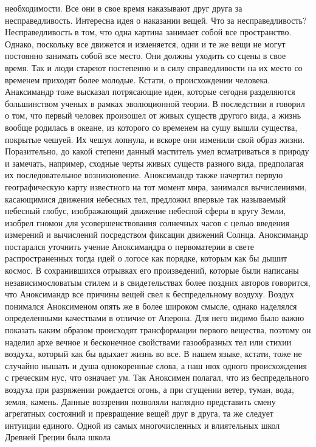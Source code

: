 необходимости. Все они в свое время наказывают друг друга за несправедливость.
Интересна идея о наказании вещей. Что за несправедливость? Несправедливость в
том, что одна картина занимает собой все пространство. Однако, поскольку все
движется и изменяется, одни и те же вещи не могут постоянно занимать собой все
место. Они должны уходить со сцены в свое время. Так и люди стареют постепенно и
в силу справедливости на их место со временем приходят более молодые. Кстати, о
происхождении человека. Анаксимандр тоже высказал потрясающие идеи, которые
сегодня разделяются большинством ученых в рамках эволюционной теории. В
последствии я говорил о том, что первый человек произошел от живых существ
другого вида, а жизнь вообще родилась в океане, из которого со временем на сушу
вышли существа, покрытые чешуей. Их чешуя лопнула, и вскоре они изменили свой
образ жизни. Поразительно, до какой степени данный маститель умел всматриваться
в природу и замечать, например, сходные черты живых существ разного вида,
предполагая их последовательное возникновение. Аноксимандр также начертил первую
географическую карту известного на тот момент мира, занимался вычислениями,
касающимися движения небесных тел, предложил впервые так называемый небесный
глобус, изображающий движение небесной сферы в кругу Земли, изобрел гномон для
усовершенствования солнечных часов с целью введения измерений и вычислений
посредством фиксации движений Солнца. Аноксимандр постарался уточнить учение
Аноксимандра о первоматерии в свете распространенных тогда идей о логосе как
порядке, которым как бы дышит космос. В сохранившихся отрывках его произведений,
которые были написаны независимословатым стилем и в свидетельствах более поздних
авторов говорится, что Аноксимандр все причины вещей свел к беспредельному
воздуху. Воздух понимался Аноксименом опять же в более широком смысле, однако
наделялся определенными качествами в отличие от Аперона. Для него видимо было
важно показать каким образом происходят трансформации первого вещества, поэтому
он наделил архе вечное и бесконечное свойствами газообразных тел или стихии
воздуха, который как бы вдыхает жизнь во все. В нашем языке, кстати, тоже не
случайно нышать и душа однокоренные слова, а наш нюх одного происхождения с
греческим нус, что означает ум. Так Аноксимен полагал, что из беспредельного
воздуха при разряжении рождается огонь, а при сгущении ветер, туман, вода,
земля, камень. Данные воззрения позволяли наглядно представить смену агрегатных
состояний и превращение вещей друг в друга, та же следует интуиции единого.
Одной из самых многочисленных и влиятельных школ Древней Греции была школа
